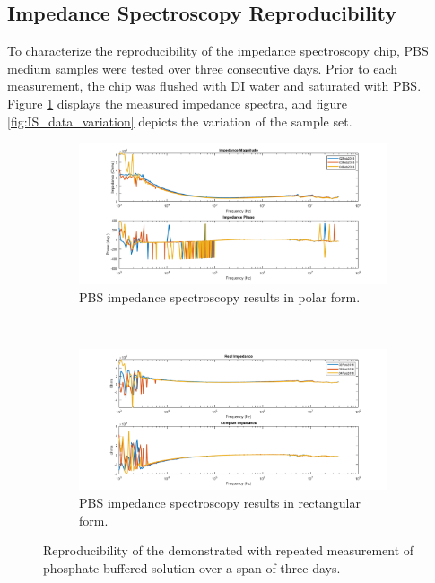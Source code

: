\FloatBarrier

\clearpage

\subsection{Impedance Spectroscopy Reproducibility}

\par To characterize the reproducibility of the impedance spectroscopy chip, PBS medium samples were tested over three consecutive days. Prior to each measurement, the chip was flushed with DI water and saturated with PBS. Figure \ref{fig:IS_data_reproducibility} displays the measured impedance spectra, and figure \ref{fig:IS_data_variation} depicts the variation of the sample set. 

\begin{figure}[h]
    \centering
    \begin{subfigure}[b]{\textwidth}
        \centering
        \includegraphics[width=\textwidth]{images/reproducibility_PBS_mag_phase.png}
        \caption{PBS impedance spectroscopy results in polar form.}
    \end{subfigure}
    \\
    \vspace{0.1 in}
    \begin{subfigure}[b]{\textwidth}
        \centering
        \includegraphics[width=\textwidth]{images/reproducibility_PBS_real_imag.png}
        \caption{PBS impedance spectroscopy results in rectangular form.}
    \end{subfigure}
    \caption{Reproducibility of the demonstrated with repeated measurement of phosphate buffered solution over a span of three days.}
    \label{fig:IS_data_reproducibility}
\end{figure}

